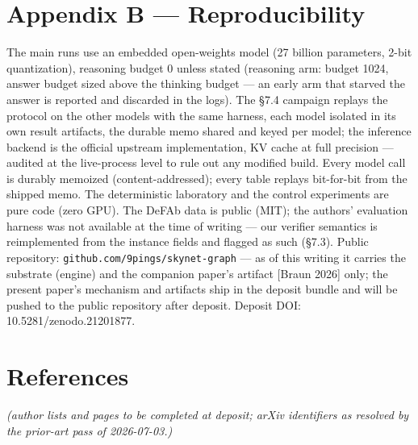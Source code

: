 \documentclass[11pt]{article}
\begin{document}
\section*{Appendix B — Reproducibility}

The main runs use an embedded open-weights model (27 billion parameters, 2-bit quantization), reasoning budget 0 unless stated (reasoning arm: budget 1024, answer budget sized above the thinking budget — an early arm that starved the answer is reported and discarded in the logs). The §7.4 campaign replays the protocol on the other models with the same harness, each model isolated in its own result artifacts, the durable memo shared and keyed per model; the inference backend is the official upstream implementation, KV cache at full precision — audited at the live-process level to rule out any modified build. Every model call is durably memoized (content-addressed); every table replays bit-for-bit from the shipped memo. The deterministic laboratory and the control experiments are pure code (zero GPU). The DeFAb data is public (MIT); the authors' evaluation harness was not available at the time of writing — our verifier semantics is reimplemented from the instance fields and flagged as such (§7.3). Public repository: \texttt{github.com/\allowbreak{}9pings/\allowbreak{}skynet-graph} — as of this writing it carries the substrate (engine) and the companion paper's artifact [Braun 2026] only; the present paper's mechanism and artifacts ship in the deposit bundle and will be pushed to the public repository after deposit. Deposit DOI: 10.5281/zenodo.21201877.

\section*{References}

\emph{(author lists and pages to be completed at deposit; arXiv identifiers as resolved by the prior-art pass of 2026-07-03.)}
\end{document}
